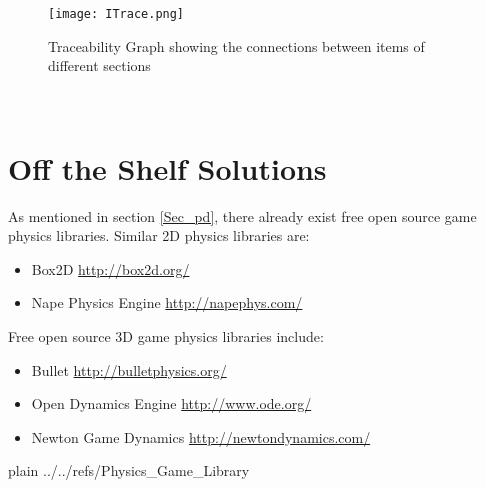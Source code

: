 \documentclass[12pt]{article}
\begin{document}
\begin{figure}[h!]
	\begin{center}
		\texttt{[image: ITrace.png]}
		\bigskip
		\caption{Traceability Graph showing the connections between items of different sections}
		\label{Fig_ITrace}
	\end{center}
\end{figure}

~\pagebreak

%
%

\section{Off the Shelf Solutions}   \label{sec_otss}
As mentioned in section \ref{Sec_pd}, there already exist free open source game
physics libraries. Similar 2D physics libraries are:
\begin{itemize} 
\item Box2D   \url{http://box2d.org/}
\item Nape Physics Engine  \url{http://napephys.com/}
\end{itemize}

\noindent
Free open source 3D game physics libraries include:
\begin{itemize} 
\item Bullet   \url{http://bulletphysics.org/}
\item Open Dynamics Engine  \url{http://www.ode.org/}
\item Newton Game Dynamics  \url{http://newtondynamics.com/}
\end{itemize}

 {plain}
 {../../refs/Physics_Game_Library}
\end{document}
